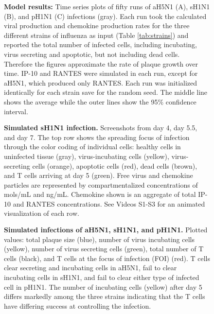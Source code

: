\documentclass[10pt]{article}
\begin{document}
\begin{figure}[ht!]
\begin{center}
 \end{center}
\caption{\textbf{Model results:} Time series plots of fifty runs of aH5N1 (A), sH1N1 (B), and pH1N1 (C) infections (gray). Each run took the calculated viral production and chemokine production rates for the three different strains of influenza as input (Table \ref{tab:strains}) and reported the total number of infected cells, including incubating, virus secreting and apoptotic, but not including dead cells.  Therefore the figures approximate the rate of plaque growth over time.  IP-10 and RANTES were simulated in each run, except for aH5N1, which  produced only RANTES.  Each run was initialized identically for each strain save for the random seed.  The middle line shows the average while the outer lines show the 95\% confidence interval.} 
 \label{fig:variance}
\end{figure}

\begin{figure}[!ht]
\begin{center}
 \end{center}
\caption{{\bf Simulated sH1N1 infection.} Screenshots from day 4, day 5.5, and day 7.  The top row shows the spreading focus of infection  through the color coding of individual cells:  healthy cells in uninfected tissue (gray),  virus-incubating cells (yellow), virus-secreting cells (orange), apoptotic cells (red), dead cells (brown), and T cells arriving at day 5 (green).  Free virus and chemokine particles are represented by compartmentalized concentrations of mols/mL and ng/mL.  Chemokine shown is an aggregate of total IP-10 and RANTES concentrations.  See Videos S1-S3 for an animated visualization of each row.} 
 \label{fig:cycells}
\end{figure}


\begin{figure}[!ht]
\begin{center}
 \end{center}
\caption{{\bf Simulated infections of aH5N1, sH1N1, and pH1N1.} Plotted values: total plaque size (blue), number of virus incubating cells (yellow), number of virus secreting cells (green), total number of T cells (black), and T cells at the focus of infection (FOI) (red).  T cells clear secreting and incubating cells in aH5N1, fail to clear incubating cells in sH1N1, and fail to clear either type of infected cell in pH1N1.  The number of incubating cells (yellow) after day 5 differs markedly among the three strains indicating that the T cells have differing success at controlling the infection.} 
 \label{fig:plaquesize}
\end{figure}
\end{document}
